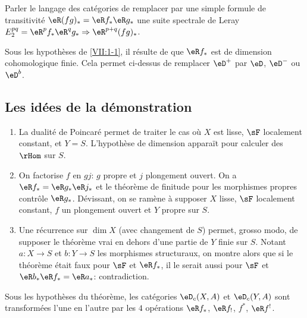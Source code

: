 Parler le langage des catégories  de remplacer par 
une simple formule de transitivité $\eR(f g)_\ast = \eR f_\ast \eR g_\ast$ 
une suite spectrale de Leray 
$E_2^{p q} = \eR^p f_\ast \eR^q g_\ast \Rightarrow \eR^{p+q} (f g)_\ast$. 

Sous les hypothèses de \ref{VII:1-1}, il résulte de  que 
$\eR f_\ast$ est de dimension cohomologique finie. Cela permet ci-dessus de 
remplacer $\eD^+$ par $\eD$, $\eD^-$ ou $\eD^b$. 





\subsection{Les idées de la démonstration}\label{VII:1-4}
\begin{enumerate}[\indent a)]
  \item La dualité de Poincaré permet de traiter le cas où $X$ est 
    lisse, $\sF$ localement constant, et $Y=S$. L'hypothèse de dimension 
    appara\"it pour calculer des $\rHom$ sur $S$.
  \item On factorise $f$ en $g j$: $g$ propre et $j$ plongement ouvert. On a 
    $\eR f_\ast = \eR g_\ast \eR j_\ast$ et le théorème de finitude pour 
    les morphismes propres contrôle $\eR g_\ast$. Dévissant, on se ramène 
    à supposer $X$ lisse, $\sF$ localement constant, $f$ un plongement ouvert 
    et $Y$ propre sur $S$. 
  \item Une récurrence sur $\dim X$ (avec changement de $S$) permet, grosso 
    modo, de supposer le théorème vrai en dehors d'une partie de $Y$ finie 
    sur $S$. Notant $a:X\to S$ et $b:Y\to S$ les morphismes structuraux, on 
    montre alors que si le théorème était faux pour $\sF$ et 
    $\eR f_\ast$, il le serait aussi pour $\sF$ et 
    $\eR b_\ast \eR f_\ast = \eR a_\ast$: contradiction. 
\end{enumerate}





\begin{corollary_}\label{VII:1-5}
Sous les hypothèses du théorème, les catégories $\eD_c(X,A)$ et 
$\eD_c(Y,A)$ sont transformées l'une en l'autre par les $4$ opérations 
$\eR f_\ast$, $\eR f_!$, $f^\ast$, $\eR f^!$. 
\end{corollary_}

